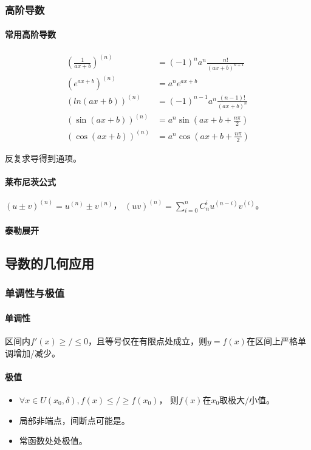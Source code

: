 \documentclass[
12pt, %
a4paper, 
oneside, %
headinclude,footinclude, %
]{scrartcl}
\begin{document}
\subsubsection{高阶导数}
\paragraph{常用高阶导数}
\begin{align*}
(\frac{1}{ax + b})^{(n)} &= (-1)^n a^n \frac{n!}{(ax + b)^{n + 1}} \\
(e^{ax + b})^{(n)} &= a^n e^{ax + b} \\
(ln(ax + b))^{(n)} &= (-1)^{n - 1} a^n \frac{(n - 1)!}{(ax + b)^n} \\
(\sin(ax + b))^{(n)} &= a^n \sin(ax + b + \frac{n\pi}{2}) \\
(\cos(ax + b))^{(n)} &= a^n \cos(ax + b + \frac{n\pi}{2})
\end{align*}

反复求导得到通项。
\paragraph{莱布尼茨公式}
$ (u \pm v)^{(n)} = u^{(n)} \pm v^{(n)} $，
$ (uv)^{(n)} = \sum_{i = 0}^n C_n^i u^{(n - i)}v^{(i)} $。
\paragraph{泰勒展开}
\subsection{导数的几何应用}
\subsubsection{单调性与极值}
\paragraph{单调性}
区间内$ f'(x) \geq/\leq 0 $，且等号仅在有限点处成立，则$ y = f(x) $在区间上严格单调增加/减少。
\paragraph{极值}
\begin{itemize}
\item $ \forall x \in U(x_0, \delta), f(x) \leq/\geq f(x_0) $，
则$ f(x) $在$ x_0 $取极大/小值。
\item 局部非端点，间断点可能是。
\item 常函数处处极值。
\end{itemize}
\end{document}
